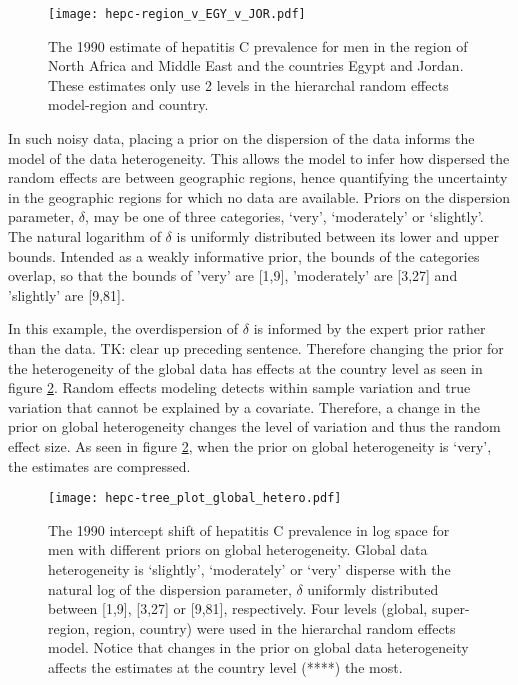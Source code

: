     \begin{figure}[h]
        \begin{center}
            \texttt{[image: hepc-region\_v\_EGY\_v\_JOR.pdf]}
            \caption{The 1990 estimate of hepatitis C prevalence for men in the region of North Africa and Middle East and the countries Egypt and Jordan.  These estimates only use 2 levels in the hierarchal random effects model-region and country.}
            \label{fig:app-hepc regional rfx}
        \end{center}
    \end{figure}

In such noisy data, placing a prior on the dispersion of the data informs the model of the data heterogeneity.  This allows the model to infer how dispersed the random effects are between geographic regions, hence quantifying the uncertainty in the geographic regions for which no data are available.  Priors on the dispersion parameter, $\delta$, may be one of three categories, `very', `moderately' or `slightly'.  The natural logarithm of $\delta$ is uniformly distributed between its lower and upper bounds.  Intended as a weakly informative prior, the bounds of the categories overlap, so that the bounds of 'very' are [1,9], 'moderately' are [3,27] and 'slightly' are [9,81].

In this example, the overdispersion of $\delta$ is informed by the expert prior rather than the data.  TK: clear up preceding sentence. Therefore changing the prior for the heterogeneity of the global data has effects at the country level as seen in figure \ref{fig:app-hepc global hetero}.  Random effects modeling detects within sample variation and true variation that cannot be explained by a covariate.  Therefore, a change in the prior on global heterogeneity changes the level of variation and thus the random effect size.  As seen in figure \ref{fig:app-hepc global hetero}, when the prior on global heterogeneity is `very', the estimates are compressed.

    \begin{figure}[h]
        \begin{center}
            \texttt{[image: hepc-tree\_plot\_global\_hetero.pdf]}
            \caption{The 1990 intercept shift of hepatitis C prevalence in log space for men with different priors on global heterogeneity.  Global data heterogeneity is `slightly', `moderately' or `very' disperse with the natural log of the dispersion parameter, $\delta$ uniformly distributed between [1,9], [3,27] or [9,81], respectively.  Four levels (global, super-region, region, country) were used in the hierarchal random effects model.  Notice that changes in the prior on global data heterogeneity affects the estimates at the country level (****) the most.}
            \label{fig:app-hepc global hetero}
        \end{center}
    \end{figure}

